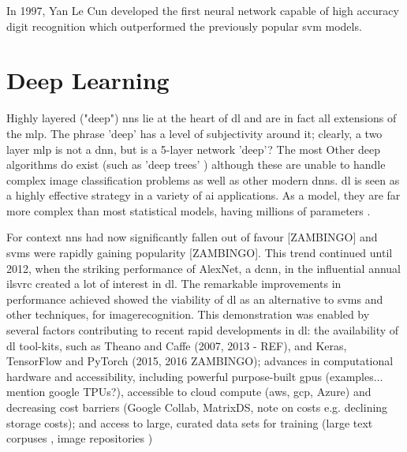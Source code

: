 In 1997, Yan Le Cun developed the first neural network capable of high accuracy digit recognition which outperformed the previously popular \gls{svm} models. \bigskip



\section{Deep Learning}


Highly layered ("deep") \gls{nn}s lie at the heart of \gls{dl} and are in fact all extensions of the \gls{mlp}. The phrase 'deep' has a level of subjectivity around it; clearly, a two \gls{layer} \gls{mlp} is not a \gls{dnn}, but is a 5-layer network 'deep'? The most Other deep algorithms do exist (such as 'deep trees' \cite{deep_forest}) although these are unable to handle complex image classification problems as well as other modern {dnn}s. \gls{dl} is seen as a highly effective strategy in a variety of \gls{ai} applications. As a model, they are far more complex than most statistical models, having millions of parameters \cite{unreasonable_dl}.  \bigskip

For context \gls{nn}s had now significantly fallen out of favour [ZAMBINGO] and \gls{svm}s were rapidly gaining popularity [ZAMBINGO]. This trend continued until 2012, when the striking performance of AlexNet, a \gls{dcnn}, in the influential annual \gls{ilsvrc} created a lot of interest in \gls{dl}. The remarkable improvements in performance achieved showed the viability of \gls{dl} as an alternative to \gls{svm}s and other techniques, for \gls{imagerecognition}. This demonstration was enabled by several factors contributing to recent rapid developments in \gls{dl}: the availability of \gls{dl} tool-kits, such as Theano and Caffe (2007, 2013 - REF), and Keras, TensorFlow and PyTorch (2015, 2016 ZAMBINGO); advances in computational hardware and accessibility, including powerful purpose-built \gls{gpu}s (examples... mention google TPUs?), accessible to cloud compute (\gls{aws}, \gls{gcp}, Azure) and decreasing cost barriers (Google Collab, MatrixDS, note on costs e.g. declining storage costs); and access to large, curated data sets for training (large text corpuses \cite{enron_emails}, image repositories \cite{image_net}) \bigskip

